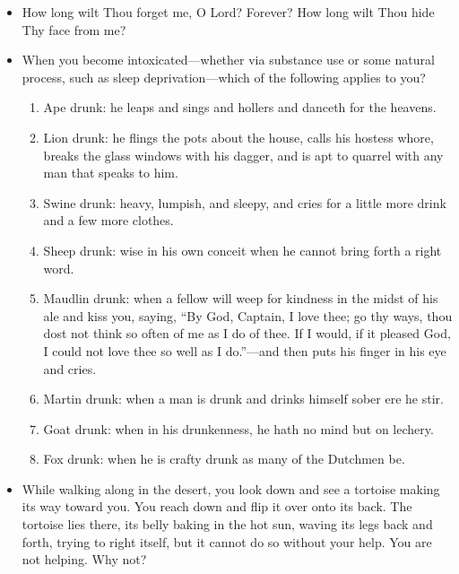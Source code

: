\begin{itemize}
\tightlist
\item
  How long wilt Thou forget me, O Lord? Forever? How long wilt Thou hide Thy face from me?
\item
  When you become intoxicated---whether via substance use or some natural process, such as sleep deprivation---which of the following applies to you?

  \begin{enumerate}
  \def\labelenumi{\arabic{enumi}.}
  \tightlist
  \item
    Ape drunk: he leaps and sings and hollers and danceth for the heavens.
  \item
    Lion drunk: he flings the pots about the house, calls his hostess whore, breaks the glass windows with his dagger, and is apt to quarrel with any man that speaks to him.
  \item
    Swine drunk: heavy, lumpish, and sleepy, and cries for a little more drink and a few more clothes.
  \item
    Sheep drunk: wise in his own conceit when he cannot bring forth a right word.
  \item
    Maudlin drunk: when a fellow will weep for kindness in the midst of his ale and kiss you, saying, ``By God, Captain, I love thee; go thy ways, thou dost not think so often of me as I do of thee. If I would, if it pleased God, I could not love thee so well as I do.''---and then puts his finger in his eye and cries.
  \item
    Martin drunk: when a man is drunk and drinks himself sober ere he stir.
  \item
    Goat drunk: when in his drunkenness, he hath no mind but on lechery.
  \item
    Fox drunk: when he is crafty drunk as many of the Dutchmen be.
  \end{enumerate}
\item
  While walking along in the desert, you look down and see a tortoise making its way toward you. You reach down and flip it over onto its back. The tortoise lies there, its belly baking in the hot sun, waving its legs back and forth, trying to right itself, but it cannot do so without your help. You are not helping. Why not?


\end{itemize}
